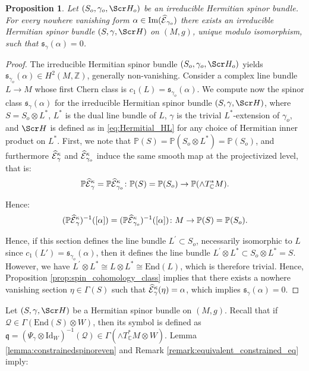 \documentclass[10pt,a4paper,twoside,reqno]{amsart}
\theoremstyle{plain}
\newtheorem{prop}[thm]{Proposition}
\theoremstyle{definition}
\theoremstyle{remark}
\newcommand{\End}{\mathrm{End}}
\def\C{\mathbb{C}}
\def\cQ{\mathcal{Q}}
\def\Id{\mathrm{Id}}
\def\frq{\mathfrak{q}}
\def\scS{\Scr H}
\def\hcE{\smash{\widehat{\mathcal{E}}}}
\def\P{\mathbb{P}}
\def\Im{\mathrm{Im}}
\begin{document}
\begin{prop}
\label{prop:spin_spinor_class=0}
Let $(S_o,\gamma_o,\scS_o)$ be an irreducible Hermitian spinor bundle. For every nowhere vanishing form $\alpha\in \Im(\hcE_{\gamma_o})$ there exists an irreducible Hermitian spinor bundle $(S,\gamma,\scS)$ on $(M,g)$, unique modulo isomorphism, such that $\mathfrak{s}_{\gamma}(\alpha)=0$.
\end{prop}

\begin{proof}
The irreducible Hermitian spinor bundle $(S_o,\gamma_o,\scS_o)$ yields $\mathfrak{s}_{\gamma_o}(\alpha)\in H^2(M,\mathbb{Z})$, generally non-vanishing. Consider a complex line bundle $L\to M$ whose first Chern class is $c_1(L)=\mathfrak{s}_{\gamma_o}(\alpha)$. We compute now the spinor class $\mathfrak{s}_{\gamma}(\alpha)$ for the irreducible Hermitian spinor bundle $(S,\gamma,\scS)$, where $S=S_o\otimes L^{\ast}$, $L^*$ is the dual line bundle of $L$, $\gamma$ is the trivial $L^*$-extension of $\gamma_o$, and $\scS$ is defined as in \eqref{eq:Hermitial_HL} for any choice of Hermitian inner product on $L^*$. First, we note that $\P(S)=\P(S_o\otimes L^{\ast})=\P(S_o)$, and furthermore $\hcE^\kappa_\gamma$ and $\hcE^\kappa_{\gamma_o}$ induce the same smooth map at the projectivized level, that is: $$\P\hcE^\kappa_\gamma=\P\hcE^\kappa_{\gamma_o}\colon\P(S)=\P(S_o)\to\P(\wedge T^*_\C M).$$

Hence: $$(\P\hcE^\kappa_\gamma)^{-1}([\alpha])=(\P\hcE^\kappa_{\gamma_o})^{-1}([\alpha])\colon M\to\P(S)=\P(S_o).$$
    
Hence, if this section defines the line bundle $L^{\prime}\subset S_o$, necessarily isomorphic to $L$ since $c_1(L')=\mathfrak{s}_{\gamma_o}(\alpha)$, then it defines the line bundle $L^{\prime}\otimes L^{\ast}\subset S_o\otimes L^{\ast}=S$. However, we have $L^{\prime}\otimes L^{\ast}\cong L\otimes L^{\ast}\cong\End(L)$, which is therefore trivial. Hence, Proposition \ref{prop:spin_cohomology_class} implies that there exists a nowhere vanishing section $\eta\in\Gamma(S)$ such that $\hcE^\kappa_\gamma(\eta)=\alpha$, which implies $\mathfrak{s}_\gamma(\alpha)=0$.
\end{proof} 

Let $(S,\gamma,\scS)$ be a Hermitian spinor bundle on $(M,g)$. Recall that if $\cQ\in\Gamma(\End(S)\otimes W)$, then its symbol is defined as $\frq=(\Psi_\gamma\otimes\Id_W)^{-1}(\cQ)\in\Gamma(\wedge T^*_\C M\otimes W)$. Lemma \ref{lemma:constrainedspinoreven} and Remark \ref{remark:equivalent_constrained_eq} imply:
\end{document}
